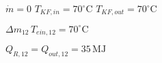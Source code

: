 \( \dot{m} = 0 \)  
\( T_{KF,in} = 70^\circ \text{C} \)  
\( T_{KF,out} = 70^\circ \text{C} \)  

\( \Delta m_{12} \, T_{ein,12} = 70^\circ \text{C} \)  

\( Q_{R,12} = Q_{out,12} = 35 \, \text{MJ} \)